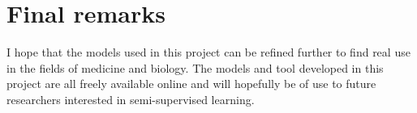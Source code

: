 \section{Final remarks}

I hope that the models used in this project can be refined further to find real use in the fields of medicine and biology. The models and tool
developed in this project are all freely available online and will hopefully be of use to future researchers interested in semi-supervised
learning.